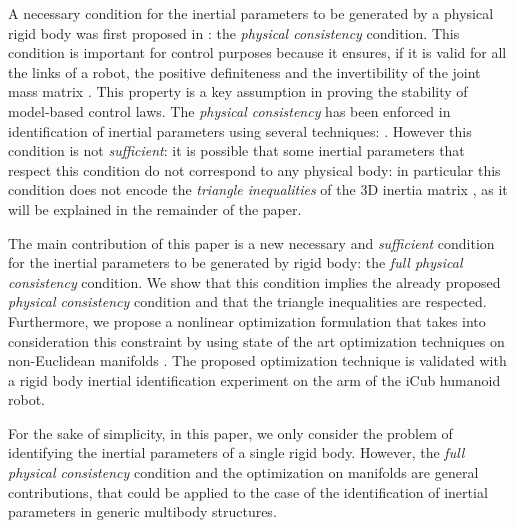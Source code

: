 A necessary condition for the inertial parameters to be generated by a physical rigid body was first proposed in \cite{yoshida1994}: the \emph{physical consistency} condition.  
This condition is important for control purposes because it ensures, if it is valid for all the links of a robot, the positive definiteness and the invertibility of the joint mass matrix \cite{yoshida2000}. This property is a key assumption in proving the stability of model-based control laws. 
The \emph{physical consistency} has been enforced in identification of inertial parameters  using several techniques: \cite{yoshida2000,mata2005,gautier2013identification,gautier2013positive,sousa2014physical,jovic2015identification}. However this condition is not \emph{sufficient}: it is possible that some inertial parameters that respect this condition do not correspond to any physical body: in particular this condition does not encode the \emph{triangle inequalities} of the 3D inertia matrix \cite[Chapter 3]{wittenburg2007dynamics}, as it will be explained in the remainder of the paper.

The main contribution of this paper is a new necessary and \emph{sufficient} condition for the inertial parameters to be generated by rigid body: the \emph{full physical consistency} condition. We show that this condition implies the already proposed \emph{physical consistency} condition and that the triangle inequalities are respected. Furthermore, we propose a nonlinear optimization formulation that takes into consideration this constraint by using state of the art optimization techniques on non-Euclidean manifolds \cite{brossette2015humanoid}. The proposed optimization technique is validated with a rigid body inertial identification experiment on the arm of the iCub humanoid robot.

For the sake of simplicity, in this paper, we only consider the problem of identifying the inertial parameters of a single rigid body. However, the \emph{full physical consistency} condition and the optimization on manifolds are general contributions, that could be applied to the case of the identification of inertial parameters in generic multibody structures. 

